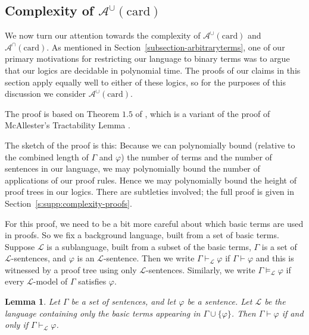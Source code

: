 \documentclass[letterpaper]{article}
\newtheorem{lemma}[theorem]{Lemma}
\theoremstyle{definition}
\newcommand{\Aunion}{\mathscr{A}^{\cup}}
\newcommand{\Ainter}{\mathscr{A}^{\cap}}
\newcommand{\card}{\mathrm{card}}
\begin{document}
\subsection{Complexity of $\Aunion(\card)$}

We now turn our attention towards the complexity of $\Aunion(\card)$ and $\Ainter(\card)$.  As mentioned in Section~\ref{subsection-arbitraryterms}, one of our primary motivations for restricting our language to binary terms was to argue that our logics are decidable in polynomial time.
The proofs of our claims in this section apply equally well to either of these logics, so for the purposes of this discussion we consider $\Aunion(\card)$.

The proof %
is based on Theorem $1.5$ of \cite{exploring_the_landscape}, which is a variant of the proof of McAllester's Tractability Lemma \cite{recognition_of_tractability}.


The sketch of the proof is this:  Because we can polynomially bound (relative to the combined length of $\Gamma$ and $\varphi$) the number of terms and the number of sentences in our language, we may polynomially bound the number of applications of our proof rules.  Hence we may polynomially bound the height of proof trees in our logics.  There are subtleties involved; the full proof is given in Section~\ref{s:supp:complexity-proofs}.

For this proof, we need to be a bit more careful about which basic terms are used in proofs. So we fix a background language, built from a set of basic terms. Suppose $\mathcal{L}$ is a sublanguage, built from a subset of the basic terms, $\Gamma$ is a set of $\mathcal{L}$-sentences, and $\varphi$ is an $\mathcal{L}$-sentence. Then we write $\Gamma\vdash_{\mathcal{L}} \varphi$ if $\Gamma\vdash \varphi$ and this is witnessed by a proof tree using only $\mathcal{L}$-sentences. Similarly, we write $\Gamma\models_{\mathcal{L}} \varphi$ if every $\mathcal{L}$-model of $\Gamma$ satisfies $\varphi$. 


\begin{lemma}\label{lemma-language}
Let $\Gamma$ be a set of sentences, and let $\varphi$ be a sentence. Let $\mathcal{L}$ be the language containing only the basic terms appearing in $\Gamma \cup \{\varphi\}$. Then $\Gamma\vdash \varphi$ if and only if $\Gamma\vdash_{\mathcal{L}} \varphi$. 
\end{lemma}
\end{document}
